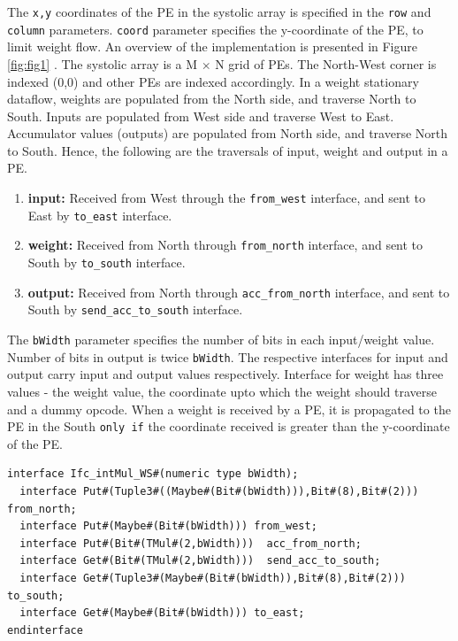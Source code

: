 \documentclass{article}
\begin{document}
The \texttt{x,y} coordinates of the PE in the systolic array is specified in the \texttt{row} and \texttt{column} parameters. \texttt{coord} parameter specifies the y-coordinate of the PE, to limit weight flow. An overview of the implementation is presented in Figure \ref{fig:fig1} . The systolic array is a M $\times$ N grid of PEs. The North-West corner is indexed (0,0) and other PEs are indexed accordingly. In a weight stationary dataflow, weights are populated from the North side, and traverse North to South. Inputs are populated from West side and traverse West to East. Accumulator values (outputs) are populated from North side, and traverse North to South. Hence, the following are the traversals of input, weight and output in a PE.

\begin{enumerate}
  \item \textbf{input:} Received from West through the \texttt{from\_west} interface, and sent to East by \texttt{to\_east} interface.
  \item \textbf{weight:} Received from North through \texttt{from\_north} interface, and sent to South by \texttt{to\_south} interface.
  \item \textbf{output:} Received from North through \texttt{acc\_from\_north} interface, and sent to South by \texttt{send\_acc\_to\_south} interface.
\end{enumerate}

The \texttt{bWidth} parameter specifies the number of bits in each input/weight value. Number of bits in output is twice \texttt{bWidth}. The respective interfaces for input and output carry input and output values respectively. Interface for weight has three values - the weight value, the coordinate upto which the weight should traverse and a dummy opcode. When a weight is received by a PE, it is propagated to the PE in the South \texttt{only if} the coordinate received is greater than the y-coordinate of the PE.

\begin{verbatim}
interface Ifc_intMul_WS#(numeric type bWidth);
  interface Put#(Tuple3#((Maybe#(Bit#(bWidth))),Bit#(8),Bit#(2))) from_north;
  interface Put#(Maybe#(Bit#(bWidth))) from_west;
  interface Put#(Bit#(TMul#(2,bWidth)))  acc_from_north;
  interface Get#(Bit#(TMul#(2,bWidth)))  send_acc_to_south;  
  interface Get#(Tuple3#(Maybe#(Bit#(bWidth)),Bit#(8),Bit#(2))) to_south;
  interface Get#(Maybe#(Bit#(bWidth))) to_east;
endinterface
\end{verbatim}
\end{document}
